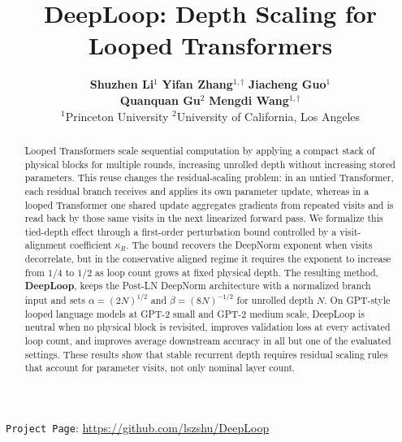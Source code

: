 \documentclass[11pt]{airesearch}
\title{\bfseries DeepLoop: Depth Scaling for Looped Transformers}
\author{
\textbf{Shuzhen Li}$^1$ \quad
\textbf{Yifan Zhang}$^{1,\dagger}$
\quad \textbf{Jiacheng Guo}$^1$\\[0.5mm]
\textbf{Quanquan Gu}$^2$ \quad
\textbf{Mengdi Wang}$^{1,\dagger}$\\[1.5mm]
$^1$Princeton University \quad $^2$University of California, Los Angeles\\
}
\date{}
\newcommand{\projectpage}[1]{%
  \begin{center}
    \small
    \vspace{-1.25ex}
    \texttt{Project Page}: \url{#1}
  \end{center}
}
\begin{document}
\maketitle

\begingroup
{}
\endgroup

\begin{abstract}
Looped Transformers scale sequential computation by applying a compact stack of
physical blocks for multiple rounds, increasing unrolled depth without
increasing stored parameters. This reuse changes the residual-scaling problem: 
in an untied Transformer, each residual branch receives and applies its own
parameter update, whereas in a looped Transformer one shared update aggregates
gradients from repeated visits and is read back by those same visits in the
next linearized forward pass. We formalize this tied-depth effect through a
first-order perturbation bound controlled by a visit-alignment coefficient
$\kappa_R$. The bound recovers the DeepNorm exponent when visits decorrelate,
but in the conservative aligned regime it requires the exponent to increase
from $1/4$ to $1/2$ as loop count grows at fixed physical depth. The resulting
method, \textbf{DeepLoop}, keeps the Post-LN DeepNorm architecture with a
normalized branch input and sets
$\alpha=(2N)^{1/2}$ and $\beta=(8N)^{-1/2}$ for unrolled depth $N$. On
GPT-style looped language models at GPT-2 small and GPT-2 medium scale,
DeepLoop is neutral when no physical block is revisited, improves validation
loss at every activated loop count, and improves average downstream accuracy
in all but one of the evaluated settings. These results show that stable recurrent depth requires residual
scaling rules that account for parameter visits, not only nominal layer count.
\end{abstract}

\projectpage{https://github.com/lszshu/DeepLoop}
\end{document}
